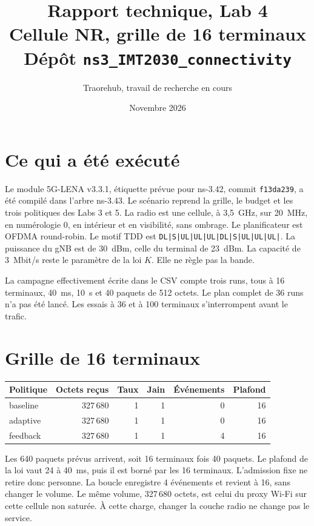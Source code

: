 \documentclass[11pt,a4paper]{article}
\title{Rapport technique, Lab 4\\
\large Cellule NR, grille de 16 terminaux\\
Dépôt \texttt{ns3\_IMT2030\_connectivity}}
\author{Traorehub, travail de recherche en cours}
\date{Novembre 2026}
\begin{document}
\maketitle

\section{Ce qui a été exécuté}

Le module 5G-LENA v3.3.1, étiquette prévue pour ns-3.42, commit \texttt{f13da239}, a été compilé dans l'arbre ns-3.43. Le scénario reprend la grille, le budget et les trois politiques des Labs 3 et 5. La radio est une cellule, à 3,5~GHz, sur 20~MHz, en numérologie 0, en intérieur et en visibilité, sans ombrage. Le planificateur est OFDMA round-robin. Le motif TDD est \texttt{DL|S|UL|UL|UL|DL|S|UL|UL|UL|}. La puissance du gNB est de 30~dBm, celle du terminal de 23~dBm. La capacité de 3~Mbit/s reste le paramètre de la loi $K$. Elle ne règle pas la bande.

La campagne effectivement écrite dans le CSV compte trois runs, tous à 16 terminaux, 40~ms, 10~s et 40 paquets de 512 octets. Le plan complet de 36 runs n'a pas été lancé. Les essais à 36 et à 100 terminaux s'interrompent avant le trafic.

\section{Grille de 16 terminaux}

\begin{center}
\begin{tabular}{@{}lrrrrr@{}}
\toprule
Politique & Octets reçus & Taux & Jain & Événements & Plafond \\
\midrule
baseline & 327\,680 & 1 & 1 & 0 & 16 \\
adaptive & 327\,680 & 1 & 1 & 0 & 16 \\
feedback & 327\,680 & 1 & 1 & 4 & 16 \\
\bottomrule
\end{tabular}
\end{center}

Les 640 paquets prévus arrivent, soit 16 terminaux fois 40 paquets. Le plafond de la loi vaut 24 à 40~ms, puis il est borné par les 16 terminaux. L'admission fixe ne retire donc personne. La boucle enregistre 4 événements et revient à 16, sans changer le volume. Le même volume, 327\,680 octets, est celui du proxy Wi-Fi sur cette cellule non saturée. À cette charge, changer la couche radio ne change pas le service.
\end{document}
